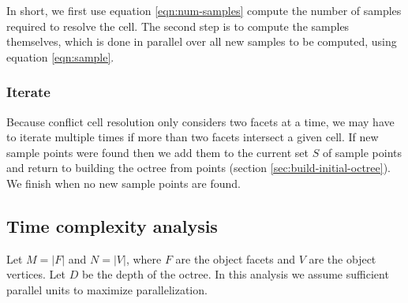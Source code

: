 \documentclass[submission]{gmp2017}
\begin{document}
In short, we first use equation \eqref{eqn:num-samples} compute the number of samples required to resolve the cell. The second step is to compute the samples themselves, which is done in parallel over all new samples to be computed, using equation \eqref{eqn:sample}.

\subsubsection{Iterate}

Because conflict cell resolution only considers two facets at a time, we may have to iterate multiple times if more than two facets intersect a given cell. If new sample points were found then we add them to the current set $S$ of sample points and return to building the octree from points (section \ref{sec:build-initial-octree}). We finish when no new sample points are found.

\subsection{Time complexity analysis}

Let $M = |F|$ and $N = |V|$, where $F$ are the object facets and $V$ are the object vertices. Let $D$ be the depth of the octree. In this analysis we assume sufficient parallel units to maximize parallelization.
\end{document}
